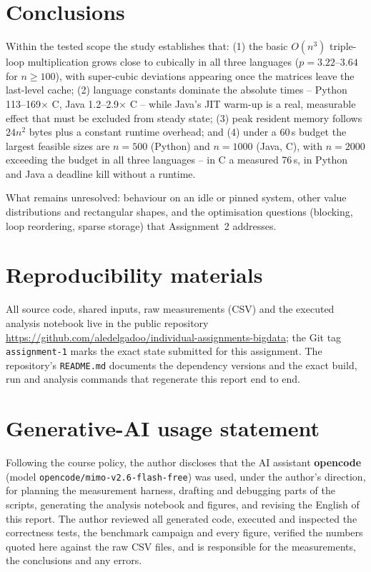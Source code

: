 \documentclass[11pt,a4paper]{article}
\begin{document}
\section{Conclusions}

Within the tested scope the study establishes that: (1) the basic $O(n^3)$
triple-loop multiplication grows close to cubically in all three languages
($p = 3.22$--$3.64$ for $n \ge 100$), with super-cubic deviations appearing once
the matrices leave the last-level cache; (2) language constants dominate the
absolute times -- Python 113--169$\times$ C, Java 1.2--2.9$\times$ C -- while
Java's JIT warm-up is a real, measurable effect that must be excluded from steady
state; (3) peak resident memory follows $24n^2$ bytes plus a constant runtime
overhead; and (4) under a 60\,s budget the largest feasible sizes are $n=500$
(Python) and $n=1000$ (Java, C), with $n=2000$ exceeding the budget in all three
languages -- in C a measured 76\,s, in Python and Java a deadline kill without a
runtime.

What remains unresolved: behaviour on an idle or pinned system, other value
distributions and rectangular shapes, and the optimisation questions (blocking,
loop reordering, sparse storage) that Assignment~2 addresses.

\section{Reproducibility materials}

{\sloppy
All source code, shared inputs, raw measurements (CSV) and the executed analysis
notebook live in the public repository
\url{https://github.com/aledelgadoo/individual-assignments-bigdata};
the Git tag \texttt{assignment-1} marks the exact state submitted for this
assignment. The repository's \texttt{README.md} documents the dependency
versions and the exact build, run and analysis commands that regenerate this
report end to end.\par}

\section*{Generative-AI usage statement}

Following the course policy, the author discloses that the AI assistant
\textbf{opencode} (model \texttt{opencode/mimo-v2.6-flash-free}) was used, under
the author's direction, for planning the measurement harness, drafting and
debugging parts of the scripts, generating the analysis notebook and figures, and
revising the English of this report. The author reviewed all generated code,
executed and inspected the correctness tests, the benchmark campaign and every
figure, verified the numbers quoted here against the raw CSV files, and is
responsible for the measurements, the conclusions and any errors.
\end{document}

